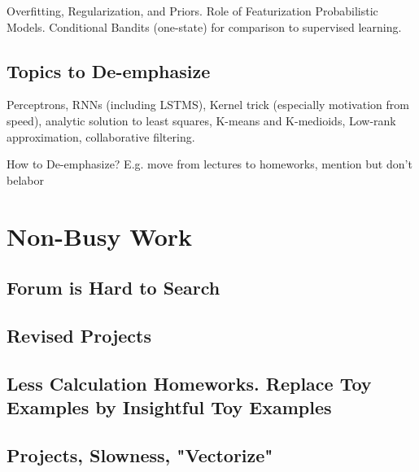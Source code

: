 \documentclass[12pt]{article}
\begin{document}
      Overfitting, Regularization, and Priors.
      Role of Featurization
      Probabilistic Models.
      Conditional Bandits (one-state) for comparison to supervised learning.

    \subsection*{Topics to De-emphasize}
      Perceptrons, RNNs (including LSTMS), Kernel trick (especially motivation
      from speed), analytic solution to least squares, K-means and K-medioids,
      Low-rank approximation, collaborative filtering.

      How to De-emphasize?
        E.g. move from lectures to homeworks, mention but don't belabor

    \subsection*{}
    \subsection*{}
    \subsection*{}

  \section*{\sc Non-Busy Work}  %
    \subsection*{}
    \subsection*{Forum is Hard to Search}
    \subsection*{Revised Projects}
    \subsection*{Less Calculation Homeworks.  Replace Toy Examples by Insightful Toy Examples}
    \subsection*{Projects, Slowness, "Vectorize"}
\end{document}
